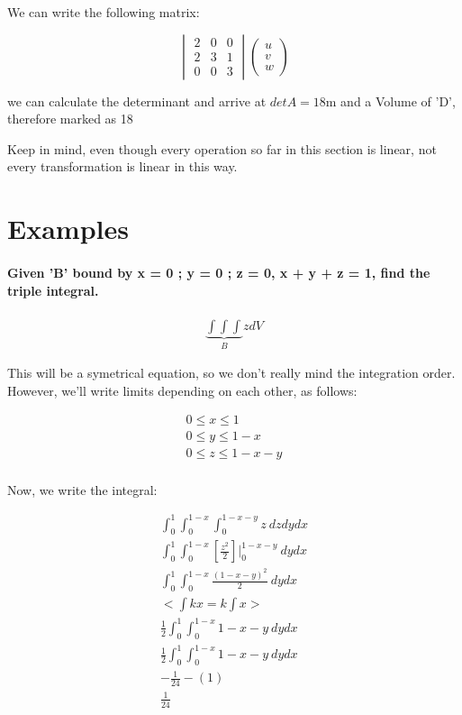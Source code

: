 \documentclass[11pt,fleqn]{book} %
\begin{document}
We can write the following matrix:

\begin{equation}
    \begin{vmatrix}
        2 & 0 & 0 \\
        2 & 3 & 1 \\
        0 & 0 & 3
    \end{vmatrix} \begin{pmatrix}
        u \\
        v \\ 
        w 
    \end{pmatrix}
\end{equation}

we can calculate the determinant and arrive at $detA = 18$m and a Volume of 'D', therefore marked as 18 

Keep in mind, even though every operation so far in this section is linear, not every transformation is linear in this way. 



\section{Examples}
\paragraph{Given 'B' bound by x = 0 ; y = 0 ; z = 0, x + y + z = 1, find the triple integral.}
\begin{gather}
    \underbrace{\int\int\int}_{B} z dV
\end{gather}

This will be a symetrical equation, so we don't really mind the integration order. However, we'll write
limits depending on each other, as follows:

\begin{gather}
    0 \leq x \leq 1 \\
    0 \leq y \leq 1-x\\
    0 \leq z \leq 1-x-y\\
\end{gather}

Now, we write the integral:

\begin{gather}
    \int_0^1 \int_0^{1-x} \int_0^{1-x-y} z \ dz dy dx\\
    \int_0^1 \int_0^{1-x} [\frac{z^2}{2}]|_0^{1-x-y} \ dy dx \\
    \int_0^1 \int_0^{1-x} \frac{(1-x-y)^2}{2} \ dy dx \\
    < \int kx = k \int x >\\
    \frac{1}{2} \int_0^1 \int_0^{1-x} 1-x-y \ dy dx \\
    \frac{1}{2} \int_0^1 \int_0^{1-x} 1-x-y \ dy dx \\
    - \frac{1}{24} - (1)\\
    \frac{1}{24}
\end{gather}
\end{document}
